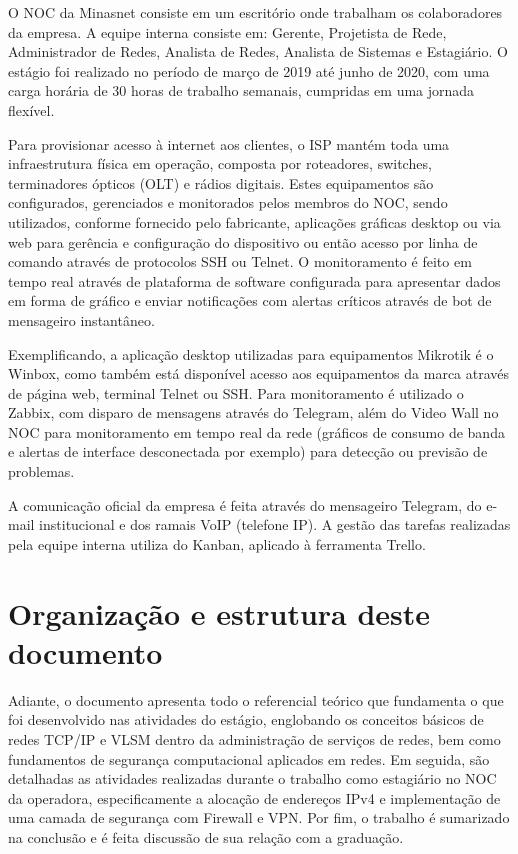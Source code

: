     O NOC da Minasnet consiste em um escritório onde trabalham os colaboradores da empresa. A equipe interna consiste em: Gerente, Projetista de Rede, Administrador de Redes, Analista de Redes, Analista de Sistemas e Estagiário. O estágio foi realizado no período de março de 2019 até junho de 2020, com uma carga horária de 30 horas de trabalho semanais, cumpridas em uma jornada flexível.  

    Para provisionar acesso à internet aos clientes, o ISP mantém toda uma infraestrutura física em operação, composta por roteadores, switches, terminadores ópticos (OLT) e rádios digitais. Estes equipamentos são configurados, gerenciados e monitorados pelos membros do NOC, sendo utilizados, conforme fornecido pelo fabricante, aplicações gráficas desktop ou via web para gerência e configuração do dispositivo ou então acesso por linha de comando através de protocolos SSH ou Telnet. O monitoramento é feito em tempo real através de plataforma de software configurada para apresentar dados em forma de gráfico e enviar notificações com alertas críticos através de bot de mensageiro instantâneo.
    
    Exemplificando, a aplicação desktop utilizadas para equipamentos Mikrotik é o Winbox, como também está disponível acesso aos equipamentos da marca através de página web, terminal Telnet ou SSH. Para monitoramento é utilizado o Zabbix, com disparo de mensagens através do Telegram, além do Video Wall no NOC para monitoramento em tempo real da rede (gráficos de consumo de banda e alertas de interface desconectada por exemplo) para detecção ou previsão de problemas.

    A comunicação oficial da empresa é feita através do mensageiro Telegram, do e-mail institucional e dos ramais VoIP (telefone IP). A gestão das tarefas realizadas pela equipe interna utiliza do Kanban, aplicado à ferramenta Trello.

\section{Organização e estrutura deste documento}

    Adiante, o documento apresenta todo o referencial teórico que fundamenta o que foi desenvolvido nas atividades do estágio, englobando os conceitos básicos de redes TCP/IP e VLSM dentro da administração de serviços de redes, bem como fundamentos de segurança computacional aplicados em redes. Em seguida, são detalhadas as atividades realizadas durante o trabalho como estagiário no NOC da operadora, especificamente a alocação de endereços IPv4 e implementação de uma camada de segurança com Firewall e VPN. Por fim, o trabalho é sumarizado na conclusão e é feita discussão de sua relação com a graduação.
